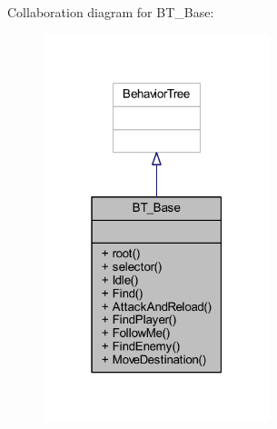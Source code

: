 Collaboration diagram for B\+T\+\_\+\+Base\+:
\nopagebreak
\begin{figure}[H]
\begin{center}
\leavevmode
\includegraphics[width=187pt]{class_b_t___base__coll__graph}
\end{center}
\end{figure}

